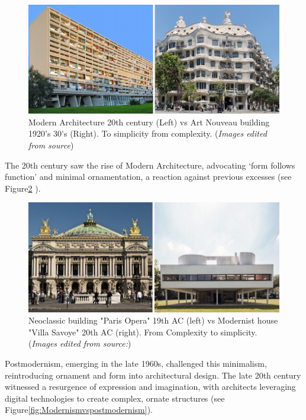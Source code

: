      \begin{figure}[htb]
          \centering
          \includegraphics[width= \linewidth]{Images/ArtNouveauVsModernism}
          \caption{Modern Architecture 20th century (Left) vs Art Nouveau building 1920's 30's (Right). To simplicity from complexity. (\textit{Images edited from source})}
          \label{fig:ArtNouveauVsModernism}
        \end{figure}

The 20th century saw the rise of Modern Architecture, advocating `form follows function' and minimal ornamentation, a reaction against previous excesses\cite{Gage2015, Venturi1972} (see Figure\ref{fig:NeoclassicalvsModernism} ).

     \begin{figure}[htb]
          \centering
          \includegraphics[width= \linewidth]{Images/NeoclassicismVsModernism}
          \caption{Neoclassic building "Paris Opera" 19th AC (left) vs Modernist house "Villa Savoye" 20th AC (right). From Complexity to simplicity. (\textit{Images edited from source:\cite{Stacbond2020}})}
          \label{fig:NeoclassicalvsModernism}
        \end{figure}

Postmodernism, emerging in the late 1960s, challenged this minimalism, reintroducing ornament and form into architectural design.
The late 20th century witnessed a resurgence of expression and imagination, with architects leveraging digital technologies to create complex, ornate structures\cite{Burlando2019} (see Figure\ref{fig:Modernismvspostmodernism}).

